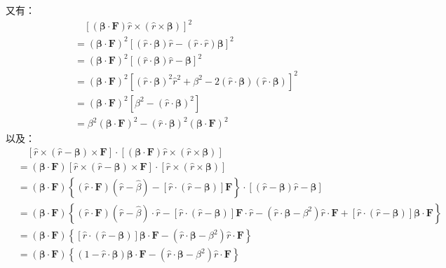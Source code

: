 \documentclass[a4paper,fontset=none]{ctexart}
\begin{document}
\begin{itemize}
    又有：
    \begin{equation}
        \begin{aligned}
            &\quad \left[(\bm{\beta} \cdot \bm{F})\hat{r} \times (\hat{r} \times \bm{\beta})\right]^2 \\
            &= (\bm{\beta} \cdot \bm{F})^2 \left[(\hat{r} \cdot \bm{\beta})\hat{r} - (\hat{r} \cdot \hat{r})\bm{\beta}\right]^2 \\
            &= (\bm{\beta} \cdot \bm{F})^2 \left[(\hat{r} \cdot \bm{\beta})\hat{r} - \bm{\beta}\right]^2 \\
            &= (\bm{\beta} \cdot \bm{F})^2 \left[(\hat{r} \cdot \bm{\beta})^2\hat{r}^2 + \beta^2 - 2(\hat{r} \cdot \bm{\beta}) (\hat{r} \cdot \bm{\beta})\right]^2 \\
            &= (\bm{\beta} \cdot \bm{F})^2 \left[\beta^2 - (\hat{r} \cdot \bm{\beta})^2\right] \\
            &= \beta^2 (\bm{\beta} \cdot \bm{F})^2 - (\hat{r} \cdot \bm{\beta})^2 (\bm{\beta} \cdot \bm{F})^2
        \end{aligned}
    \end{equation}
    以及：
    \begin{align*}
        &\quad \left[\hat{r} \times (\hat{r}-\bm{\beta}) \times \bm{F}\right] \cdot \left[(\bm{\beta} \cdot \bm{F})\hat{r} \times (\hat{r} \times \bm{\beta})\right] \\
        &= (\bm{\beta} \cdot \bm{F}) \left[\hat{r} \times (\hat{r}-\bm{\beta}) \times \bm{F}\right] \cdot \left[\hat{r} \times (\hat{r} \times \bm{\beta})\right] \\
        &= (\bm{\beta} \cdot \bm{F}) \left\{(\hat{r} \cdot \bm{F}) (\hat{r} - \hat{\beta}) - \left[\hat{r} \cdot (\hat{r} - \bm{\beta})\right] \bm{F}\right\} \cdot \left[(\hat{r} - \bm{\beta}) \hat{r} - \bm{\beta}\right] \\
        &= (\bm{\beta} \cdot \bm{F}) \left\{(\hat{r} \cdot \bm{F}) (\hat{r} - \hat{\beta}) \cdot \hat{r} - \left[\hat{r} \cdot (\hat{r} - \bm{\beta})\right] \bm{F} \cdot \hat{r} - (\hat{r} \cdot \bm{\beta} - \beta^2) \hat{r} \cdot \bm{F} + \left[\hat{r} \cdot (\hat{r} - \bm{\beta})\right] \bm{\beta} \cdot \bm{F}\right\} \\
        &= (\bm{\beta} \cdot \bm{F}) \left\{\left[\hat{r} \cdot (\hat{r} - \bm{\beta})\right] \bm{\beta} \cdot \bm{F} - (\hat{r} \cdot \bm{\beta} - \beta^2) \hat{r} \cdot \bm{F}\right\} \\
        &= (\bm{\beta} \cdot \bm{F}) \left\{(1 - \hat{r} \cdot \bm{\beta}) \bm{\beta} \cdot \bm{F} - (\hat{r} \cdot \bm{\beta} - \beta^2) \hat{r} \cdot \bm{F}\right\} \\

\end{align*}
\end{itemize}
\end{document}
